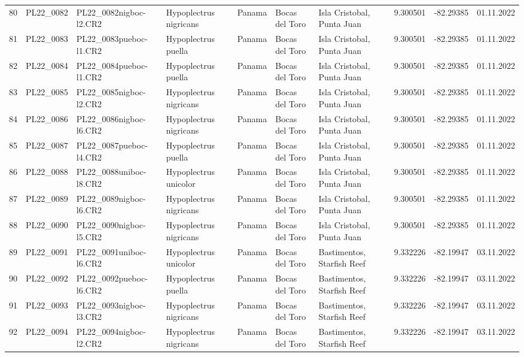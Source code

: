 \begin{table}[ht]
\begin{tabular}{rlllllllll}
  80 & PL22\_0082 & PL22\_0082nigboc-l2.CR2 & Hypoplectrus nigricans  & Panama & Bocas del Toro & Isla Cristobal, Punta Juan & 9.300501 & -82.29385 & 01.11.2022 \\ 
  81 & PL22\_0083 & PL22\_0083pueboc-l1.CR2 & Hypoplectrus puella & Panama & Bocas del Toro & Isla Cristobal, Punta Juan & 9.300501 & -82.29385 & 01.11.2022 \\ 
  82 & PL22\_0084 & PL22\_0084pueboc-l1.CR2 & Hypoplectrus puella & Panama & Bocas del Toro & Isla Cristobal, Punta Juan & 9.300501 & -82.29385 & 01.11.2022 \\ 
  83 & PL22\_0085 & PL22\_0085nigboc-l2.CR2 & Hypoplectrus nigricans  & Panama & Bocas del Toro & Isla Cristobal, Punta Juan & 9.300501 & -82.29385 & 01.11.2022 \\ 
  84 & PL22\_0086 & PL22\_0086nigboc-l6.CR2 & Hypoplectrus nigricans  & Panama & Bocas del Toro & Isla Cristobal, Punta Juan & 9.300501 & -82.29385 & 01.11.2022 \\ 
  85 & PL22\_0087 & PL22\_0087pueboc-l4.CR2 & Hypoplectrus puella & Panama & Bocas del Toro & Isla Cristobal, Punta Juan & 9.300501 & -82.29385 & 01.11.2022 \\ 
  86 & PL22\_0088 & PL22\_0088uniboc-l8.CR2 & Hypoplectrus unicolor & Panama & Bocas del Toro & Isla Cristobal, Punta Juan & 9.300501 & -82.29385 & 01.11.2022 \\ 
  87 & PL22\_0089 & PL22\_0089nigboc-l6.CR2 & Hypoplectrus nigricans  & Panama & Bocas del Toro & Isla Cristobal, Punta Juan & 9.300501 & -82.29385 & 01.11.2022 \\ 
  88 & PL22\_0090 & PL22\_0090nigboc-l5.CR2 & Hypoplectrus nigricans  & Panama & Bocas del Toro & Isla Cristobal, Punta Juan & 9.300501 & -82.29385 & 01.11.2022 \\ 
  89 & PL22\_0091 & PL22\_0091uniboc-l6.CR2 & Hypoplectrus unicolor & Panama & Bocas del Toro & Bastimentos, Starfish Reef & 9.332226 & -82.19947 & 03.11.2022 \\ 
  90 & PL22\_0092 & PL22\_0092pueboc-l6.CR2 & Hypoplectrus puella & Panama & Bocas del Toro & Bastimentos, Starfish Reef & 9.332226 & -82.19947 & 03.11.2022 \\ 
  91 & PL22\_0093 & PL22\_0093nigboc-l3.CR2 & Hypoplectrus nigricans  & Panama & Bocas del Toro & Bastimentos, Starfish Reef & 9.332226 & -82.19947 & 03.11.2022 \\ 
  92 & PL22\_0094 & PL22\_0094nigboc-l2.CR2 & Hypoplectrus nigricans  & Panama & Bocas del Toro & Bastimentos, Starfish Reef & 9.332226 & -82.19947 & 03.11.2022 \\ 

\end{tabular}
\end{table}

